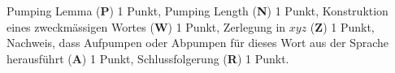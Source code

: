 \begin{bewertung}
Pumping Lemma ({\bf P}) 1 Punkt,
Pumping Length ({\bf N}) 1 Punkt,
Konstruktion eines zweckmässigen Wortes ({\bf W}) 1 Punkt,
Zerlegung in $xyz$ ({\bf Z}) 1 Punkt,
Nachweis, dass Aufpumpen oder Abpumpen für dieses Wort aus der Sprache
herausführt
({\bf A}) 1 Punkt,
Schlussfolgerung ({\bf R}) 1 Punkt.
\end{bewertung}
